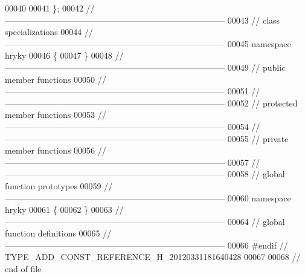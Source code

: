 \begin{DoxyCode}
00040 
00041 \};
00042 \textcolor{comment}{//
      ------------------------------------------------------------------------------}
00043 \textcolor{comment}{// class specializations}
00044 \textcolor{comment}{//
      ------------------------------------------------------------------------------}
00045 \textcolor{keyword}{namespace }hryky
00046 \{
00047 \}
00048 \textcolor{comment}{//
      ------------------------------------------------------------------------------}
00049 \textcolor{comment}{// public member functions}
00050 \textcolor{comment}{//
      ------------------------------------------------------------------------------}
00051 \textcolor{comment}{//
      ------------------------------------------------------------------------------}
00052 \textcolor{comment}{// protected member functions}
00053 \textcolor{comment}{//
      ------------------------------------------------------------------------------}
00054 \textcolor{comment}{//
      ------------------------------------------------------------------------------}
00055 \textcolor{comment}{// private member functions}
00056 \textcolor{comment}{//
      ------------------------------------------------------------------------------}
00057 \textcolor{comment}{//
      ------------------------------------------------------------------------------}
00058 \textcolor{comment}{// global function prototypes}
00059 \textcolor{comment}{//
      ------------------------------------------------------------------------------}
00060 \textcolor{keyword}{namespace }hryky
00061 \{
00062 \}
00063 \textcolor{comment}{//
      ------------------------------------------------------------------------------}
00064 \textcolor{comment}{// global function definitions}
00065 \textcolor{comment}{//
      ------------------------------------------------------------------------------}
00066 \textcolor{preprocessor}{#endif // TYPE\_ADD\_CONST\_REFERENCE\_H\_20120331181640428}
00067 \textcolor{preprocessor}{}
00068 \textcolor{comment}{// end of file}
\end{DoxyCode}
